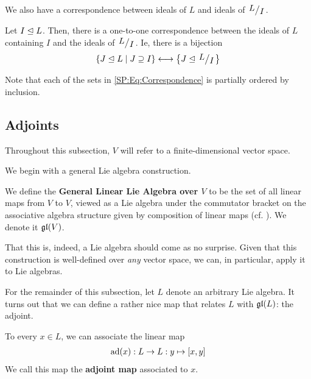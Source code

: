 
We also have a correspondence between ideals of $L$ and ideals of $\quotient{L}{I}$.

\begin{boxtheorem}\label{SP:Thm:Correspondence}
    Let $I \trianglelefteq L$. Then, there is a one-to-one correspondence between the ideals of $L$ containing $I$ and the ideals of $\quotient{L}{I}$. Ie, there is a bijection
    \begin{align}
        \setst{J \nsg L}{J \supseteq I}
        \longleftrightarrow
        \set{J \nsg \quotient{L}{I}}
    \end{align}
    \label{SP:Eq:Correspondence}
\end{boxtheorem}

Note that each of the sets in \eqref{SP:Eq:Correspondence} is partially ordered by inclusion.

\subsection{Adjoints}

Throughout this subsection, $V$ will refer to a finite-dimensional vector space.

We begin with a general Lie algebra construction.

\begin{boxdefinition}\label{Ch1:Def:gl_V}
    We define the \textbf{General Linear Lie Algebra over $V$} to be the set of all linear maps from $V$ to $V$, viewed as a Lie algebra under the commutator bracket on the associative algebra structure given by composition of linear maps (cf. ). We denote it $\mathfrak{gl}\!\left( V \right)$.
\end{boxdefinition}

That this is, indeed, a Lie algebra should come as no surprise. Given that this construction is well-defined over \textit{any} vector space, we can, in particular, apply it to Lie algebras.

For the remainder of this subsection, let $L$ denote an arbitrary Lie algebra. It turns out that we can define a rather nice map that relates $L$ with $\mathfrak{gl}\!\left( L \right)$: the adjoint.

\begin{boxdefinition}\label{Ch1:Def:AdjointMap}
    To every $x \in L$, we can associate the linear map
    \begin{align*}
        \operatorname{ad}\!\left( x \right) : L \to L : y \mapsto \left[ x, y \right]
    \end{align*}
    We call this map the \textbf{adjoint map} associated to $x$.
\end{boxdefinition}


